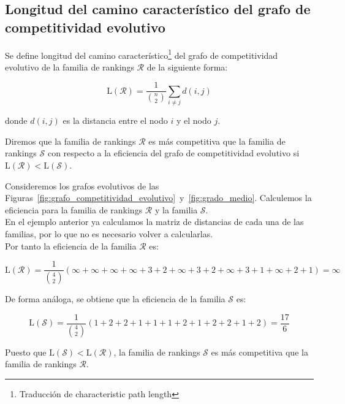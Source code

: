\subsection*{Longitud del camino característico del grafo de competitividad evolutivo}

\begin{defi}
Se define longitud del camino característico\footnote{Traducción de characteristic path length} del grafo de competitividad evolutivo de la familia de rankings $\mathcal{R}$ de la siguiente forma:

\begin{equation}
\mathrm{L}(\mathcal{R}) = \dfrac{1}{\binom{n}{2}} \sum_{i\neq j} d(i,j)
\end{equation}

donde $d(i,j)$ es la distancia entre el nodo $i$ y el nodo $j$.
\end{defi}

\begin{defi}
Diremos que la familia de rankings $\mathcal{R}$ es más competitiva que la familia de rankings $\mathcal{S}$ con respecto a la eficiencia del grafo de competitividad evolutivo si $\mathrm{L}(\mathcal{R}) < \mathrm{L}(\mathcal{S})$.
\end{defi}

\begin{ejemplo}
Consideremos los grafos evolutivos de las Figuras~\ref{fig:grafo_competitividad_evolutivo}~y~\ref{fig:grado_medio}. Calculemos la eficiencia para la familia de rankings $\mathcal{R}$ y la familia $\mathcal{S}$.\\

En el ejemplo anterior ya calculamos la matriz de distancias de cada una de las familias, por lo que no es necesario volver a calcularlas.\\

Por tanto la eficiencia de la familia $\mathcal{R}$ es:

\begin{equation*}
\mathrm{L}(\mathcal{R}) = \dfrac{1}{\binom{4}{2}} \left( \infty + \infty + \infty + \infty + 3 + 2 + \infty + 3 + 2 + \infty + 3 + 1 + \infty + 2 + 1 \right) = \infty
\end{equation*}

De forma análoga, se obtiene que la eficiencia de la familia $\mathcal{S}$ es:

\begin{equation*}
\mathrm{L}(\mathcal{S}) = \dfrac{1}{\binom{4}{2}} \left( 1 + 2 + 2 + 1 + 1 + 1 + 2 + 1  + 2 + 2 + 1 + 2  \right) =  \dfrac{17}{6} 
\end{equation*}

Puesto que $\mathrm{L}(\mathcal{S}) < \mathrm{L}(\mathcal{R})$, la familia de rankings $\mathcal{S}$ es más competitiva que la familia de rankings $\mathcal{R}$.

\end{ejemplo}